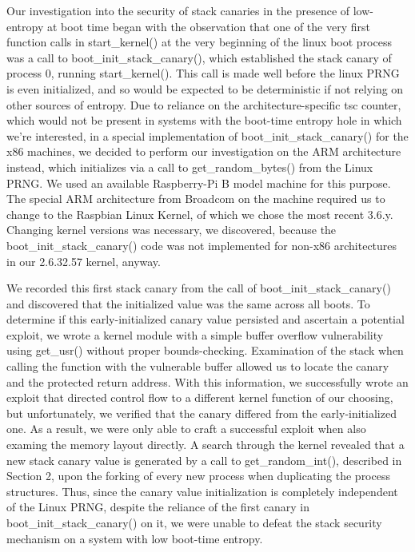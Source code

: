 Our investigation into the security of stack canaries in the presence of low-entropy at boot time began with the observation that one of the very first function calls in start\_kernel() at the very beginning of the linux boot process was a call to boot\_init\_stack\_canary(), which established the stack canary of process 0, running start\_kernel().  This call is made well before the linux PRNG is even initialized, and so would be expected to be deterministic if not relying on other sources of entropy.  Due to reliance on the architecture-specific tsc counter, which would not be present in systems with the boot-time entropy hole in which we're interested, in a special implementation of boot\_init\_stack\_canary() for the x86 machines, we decided to perform our investigation on the ARM architecture instead, which initializes via a call to get\_random\_bytes() from the Linux PRNG.  We used an available Raspberry-Pi B model machine for this purpose.  The special ARM architecture from Broadcom on the machine required us to change to the Raspbian Linux Kernel, of which we chose the most recent 3.6.y.  Changing kernel versions was necessary, we discovered, because the boot\_init\_stack\_canary() code was not implemented for non-x86 architectures in our 2.6.32.57 kernel, anyway.

We recorded this first stack canary from the call of boot\_init\_stack\_canary() and discovered that the initialized value was the same across all boots.  To determine if this early-initialized canary value persisted and ascertain a potential exploit, we wrote a kernel module with a simple buffer overflow vulnerability using get\_usr() without proper bounds-checking. Examination of the stack when calling the function with the vulnerable buffer allowed us to locate the canary and the protected return address. With this information, we successfully wrote an exploit that directed control flow to a different kernel function of our choosing, but unfortunately, we verified that the canary differed from the early-initialized one.  As a result, we were only able to craft a successful exploit when also examing the memory layout directly.  A search through the kernel revealed that a new stack canary value is generated by a call to get\_random\_int(), described in Section 2, upon the forking of every new process when duplicating the process structures.  Thus, since the canary value initialization is completely independent of the Linux PRNG, despite the reliance of the first canary in boot\_init\_stack\_canary() on it, we were unable to defeat the stack security mechanism on a system with low boot-time entropy.  
